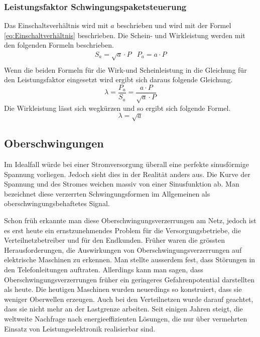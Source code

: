 \subsubsection{Leistungsfaktor Schwingungspaketsteuerung}
Das Einschaltsverhältnis wird mit $a$ beschrieben und wird mit der Formel \ref{eq:Einschaltverhältnis} beschrieben.
Die Schein- und Wirkleistung werden mit den folgenden Formeln beschrieben.
\begin{equation}\label{eq:Schw_Schein-&Wirkleistung}
\begin{array}{cc} 
S_a = \sqrt{a} \cdot P  &   P_a = a \cdot P \\
\end{array}
\end{equation} 
Wenn die beiden Formeln für die Wirk-und Scheinleistung in die Gleichung für den Leistungsfaktor eingesetzt wird ergibt sich daraus folgende Gleichung.  
\begin{equation}
\lambda = \frac{P_a }{S_a} = \frac{a \cdot P}{\sqrt{a} \cdot P}
\end{equation}
Die Wirkleistung lässt sich wegkürzen und so ergibt sich folgende Formel.
\begin{equation}
\lambda = \sqrt{a}
\end{equation}

\subsection{Oberschwingungen}
Im Idealfall würde bei einer Stromversorgung überall eine perfekte sinusförmige Spannung vorliegen. Jedoch sieht dies in der Realität anders aus. Die Kurve der Spannung und des Stromes weichen massiv von einer Sinusfunktion ab. Man bezeichnet diese verzerrten Schwingungsformen im Allgemeinen als oberschwingungsbehaftetes Signal. 

Schon früh erkannte man diese Oberschwingungsverzerrungen am Netz, jedoch ist es erst heute ein ernstzunehmendes Problem für die Versorgungsbetriebe, die Verteilnetzbetreiber und für den Endkunden. Früher waren die grössten Herausforderungen, die Auswirkungen von Oberschwingungsverzerrungen auf elektrische Maschinen zu erkennen. Man stellte ausserdem fest, dass Störungen in den Telefonleitungen auftraten. Allerdings kann man sagen, dass Oberschwingungsverzerrungen früher ein geringeres Gefahrenpotential darstellten als heute. Die heutigen Maschinen wurden neuerdings so konstruiert, dass sie weniger Oberwellen erzeugen. Auch bei den Verteilnetzen wurde darauf geachtet, dass sie nicht mehr an der Lastgrenze arbeiten. Seit einigen Jahren steigt, die weltweite Nachfrage nach energieeffizienten Lösungen, die nur über vermehrten Einsatz von Leistungselektronik realisierbar sind. 

